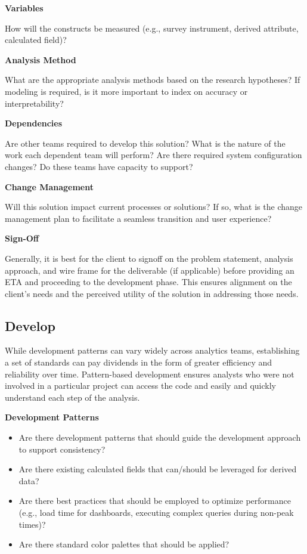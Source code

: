 \documentclass[
]{book}
\providecommand{\tightlist}{%
  \setlength{\itemsep}{0pt}\setlength{\parskip}{0pt}}
\begin{document}
\textbf{Variables}

How will the constructs be measured (e.g., survey instrument, derived attribute, calculated field)?

\textbf{Analysis Method}

What are the appropriate analysis methods based on the research hypotheses? If modeling is required, is it more important to index on accuracy or interpretability?

\textbf{Dependencies}

Are other teams required to develop this solution? What is the nature of the work each dependent team will perform? Are there required system configuration changes? Do these teams have capacity to support?

\textbf{Change Management}

Will this solution impact current processes or solutions? If so, what is the change management plan to facilitate a seamless transition and user experience?

\textbf{Sign-Off}

Generally, it is best for the client to signoff on the problem statement, analysis approach, and wire frame for the deliverable (if applicable) before providing an ETA and proceeding to the development phase. This ensures alignment on the client's needs and the perceived utility of the solution in addressing those needs.

\hypertarget{develop}{%
\subsection{Develop}\label{develop}}

While development patterns can vary widely across analytics teams, establishing a set of standards can pay dividends in the form of greater efficiency and reliability over time. Pattern-based development ensures analysts who were not involved in a particular project can access the code and easily and quickly understand each step of the analysis.

\textbf{Development Patterns}

\begin{itemize}
\tightlist
\item
  Are there development patterns that should guide the development approach to support consistency?
\item
  Are there existing calculated fields that can/should be leveraged for derived data?
\item
  Are there best practices that should be employed to optimize performance (e.g., load time for dashboards, executing complex queries during non-peak times)?
\item
  Are there standard color palettes that should be applied?
\end{itemize}
\end{document}
